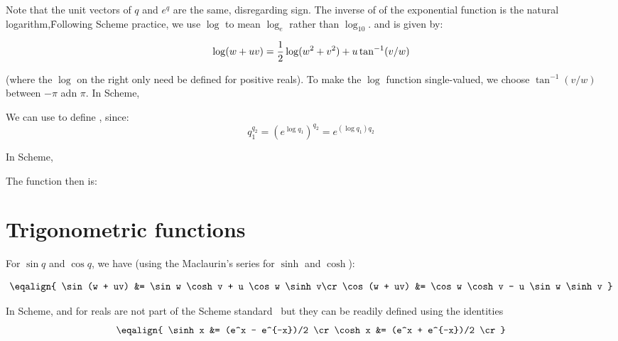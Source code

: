 \n Note that the unit vectors of $q$ and $e^q$
are the same, disregarding sign.  The inverse of
of the exponential function is the natural logarithm,\f{Following Scheme
practice, we use $\log$ to mean $\log_e$ rather than
$\log_{10}$.} and is
given by:


$$
\log (w+uv) = {1\over 2}\log(w^2+v^2) + u \tan^{-1} (v/w)
$$

\n (where the $\log$ on the right only need be defined 
for positive reals).  To make the $\log$ function single-valued,
we choose $\tan^{-1} (v/w)$ between $-\pi$ adn $\pi$.  In Scheme,


\n We can use  to define , since:
$$
q_1 ^{q_2} = (e ^ {\log q_1})^{q_2} = e ^{(\log q_1)q_2}
$$

\n In Scheme,

 
\n The  function then is:


\section{Trigonometric functions}

For $\sin q$ and $\cos q$,  we have
(using the Maclaurin's series for $\sinh$ and $\cosh$): 

$$
\eqalign{
\sin(w + uv) &= \sin w \cosh v + u \cos w \sinh v\cr
\cos(w + uv) &= \cos w \cosh v - u \sin w \sinh v
}
$$

\n In Scheme,\f{ and  for reals are not
part of the Scheme standard~\cite{r5rs} but they
can be readily defined using the
identities 
$$
\eqalign{
\sinh x &= (e^x - e^{-x})/2 \cr 
\cosh x &= (e^x + e^{-x})/2 \cr
}
$$}


